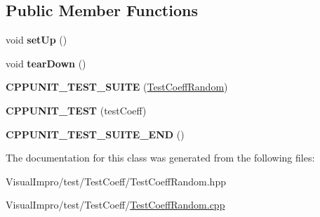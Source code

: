\subsection*{Public Member Functions}
\begin{DoxyCompactItemize}
\item 
\mbox{\label{class_test_coeff_random_a6401819ff723e25b257963594d5ff42f}} 
void {\bfseries set\+Up} ()
\item 
\mbox{\label{class_test_coeff_random_a3ea21425cf85ae8b7e7f3d5166d98612}} 
void {\bfseries tear\+Down} ()
\item 
\mbox{\label{class_test_coeff_random_a02fc753b27e82bcc2f90473c4db03af5}} 
{\bfseries C\+P\+P\+U\+N\+I\+T\+\_\+\+T\+E\+S\+T\+\_\+\+S\+U\+I\+TE} (\mbox{\hyperlink{class_test_coeff_random}{Test\+Coeff\+Random}})
\item 
\mbox{\label{class_test_coeff_random_a72aebfc2e6870bbbd7e434a962de29b3}} 
{\bfseries C\+P\+P\+U\+N\+I\+T\+\_\+\+T\+E\+ST} (test\+Coeff)
\item 
\mbox{\label{class_test_coeff_random_a043a61fb33ce1fd9bf21654b222e9b56}} 
{\bfseries C\+P\+P\+U\+N\+I\+T\+\_\+\+T\+E\+S\+T\+\_\+\+S\+U\+I\+T\+E\+\_\+\+E\+ND} ()
\end{DoxyCompactItemize}


The documentation for this class was generated from the following files\+:\begin{DoxyCompactItemize}
\item 
Visual\+Impro/test/\+Test\+Coeff/Test\+Coeff\+Random.\+hpp\item 
Visual\+Impro/test/\+Test\+Coeff/\mbox{\hyperlink{_test_coeff_random_8cpp}{Test\+Coeff\+Random.\+cpp}}\end{DoxyCompactItemize}
